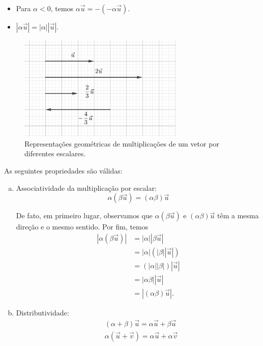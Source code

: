 \begin{obs}
  \begin{itemize}
  \item Para $\alpha<0$, temos $\alpha\vec{u} = -(-\alpha\vec{u})$.
  \item $|\alpha\vec{u}|=|\alpha||\vec{u}|$.
\end{itemize}
\end{obs}

\begin{figure}[h!]
  \centering
  \includegraphics[width=0.7\textwidth]{./cap_vetor/dados/fig_vescalar/fig_vescalar}
  \caption{Representações geométricas de multiplicações de um vetor por diferentes escalares.}
  \label{fig:vescalar}
\end{figure}

\begin{obs}
  As seguintes propriedades são válidas:
  \begin{enumerate}[a)]
  \item Associatividade da multiplicação por escalar:
    \begin{equation}
      \alpha\left(\beta\vec{u}\right) = (\alpha\beta)\vec{u}
    \end{equation}

    De fato, em primeiro lugar, observamos que $\alpha\left(\beta\vec{u}\right)$ e $(\alpha\beta)\vec{u}$ têm a mesma direção e o mesmo sentido. Por fim, temos
    \begin{align}
      |\alpha\left(\beta\vec{u}\right)| &= |\alpha||\beta\vec{u}| \\
                                        &= |\alpha|\left(|\beta||\vec{u}|\right) \\
                                        &= \left(|\alpha||\beta|\right)|\vec{u}| \\
                                        &= |\alpha\beta||\vec{u}| \\
                                        &= |(\alpha\beta)\vec{u}|.
    \end{align}
    
  \item Distributividade:
    \begin{align}
      &(\alpha + \beta)\vec{u} = \alpha\vec{u} + \beta\vec{u}\\
      &\alpha\left(\vec{u}+\vec{v}\right) = \alpha\vec{u} + \alpha\vec{v}
    \end{align}
  \end{enumerate}
\end{obs}

